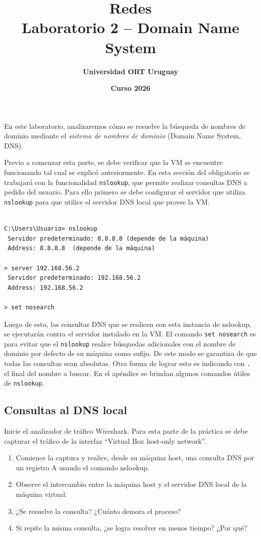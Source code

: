 \documentclass[a4paper,10pt]{article}
\title{\bf Redes\\Laboratorio 2 -- Domain Name System}
\author{\bf Universidad ORT Uruguay}
\date{\bf Curso 2026}
\begin{document}
\maketitle
\thispagestyle{fancy}

En este laboratorio, analizaremos cómo se resuelve la búsqueda de nombres de dominio mediante el \emph{sistema de nombres de dominio} (Domain Name System, DNS).

Previo a comenzar esta parte, se debe verificar que la VM se encuentre funcionando tal cual se explicó anteriormente. En esta sección del obligatorio se trabajará con la funcionalidad \texttt{nslookup}, que permite realizar consultas DNS a pedido del usuario. Para ello primero se debe configurar el servidor que utiliza \texttt{nslookup} para que utilice el servidor DNS local que provee la VM.

\begin{verbatim}

C:\Users\Usuario> nslookup
 Servidor predeterminado: 8.8.8.8 (depende de la máquina)
 Address: 8.8.8.8  (depende de la máquina)

> server 192.168.56.2
 Servidor predeterminado: 192.168.56.2
 Address: 192.168.56.2

> set nosearch
\end{verbatim}

Luego de esto, las consultas DNS que se realicen con esta instancia de nslookup, se ejecutarán contra el servidor instalado en la VM. El comando \texttt{set nosearch} es para evitar que el \texttt{nslookup} realice búsquedas adicionales con el nombre de dominio por defecto de su máquina como sufijo. De este modo se garantiza de que todas las consultas sean absolutas. Otra forma de lograr esto es indicando con \texttt{.} el final del nombre a buscar. En el apéndice se brindan algunos comandos útiles de \texttt{nslookup}.

\subsection*{Consultas al DNS local}

Inicie el analizador de tráfico Wireshark. Para esta parte de la práctica se debe capturar el tráfico de la interfaz ``Virtual Box host-only network''.

\begin{enumerate}
    \item Comience la captura y realice, desde su máquina host, una consulta DNS por un registro A usando el comando nslookup.
    \item Observe el intercambio entre la máquina host y el servidor DNS local de la máquina virtual.
    \item ¿Se resuelve la consulta? ¿Cuánto demora el proceso?
    \item Si repite la misma consulta, ¿se logra resolver en menos tiempo? ¿Por qué?
\end{enumerate}
\end{document}

